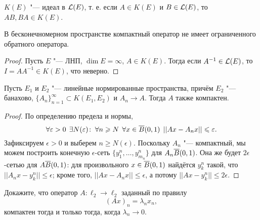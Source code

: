\documentclass[main]{subfiles}
\begin{document}
\begin{exercise}
  \( K(E) \) "--- идеал в \( \Linears{E} \),
  т. е. если \( A \in K(E) \) и \( B \in \Linears{E} \),
  то \( AB, BA \in K(E) \).
\end{exercise}

\begin{corollary}
  В бесконечномерном пространстве компактный оператор
  не имеет ограниченного обратного оператора.
\end{corollary}
\begin{proof}
  Пусть \( E \) "--- ЛНП, \( \dim E = \infty \), \( A \in K(E) \).
  Тогда если \( A^{-1} \in \Linears{E} \), то
  \( I = A A^{-1} \in K(E) \), что неверно.
\end{proof}

\begin{theorem}
  Пусть \( E_1 \) и \( E_2 \) "---
  линейные нормированные пространства,
  причём \( E_2 \) "--- банахово,
  \( \{ A_n \}_{n=1}^\infty \subset K(E_1, E_2) \)
  и \( A_n \to A \).
  Тогда \( A \) также компактен.
\end{theorem}
\begin{proof}
  По определению предела и нормы,
  \[
    \forall {\varepsilon> 0} \; \, \exists N(\varepsilon) \colon \:
    \forall {n \geqslant N} \; \,
    \forall {x \in \overline{B}(0, 1)} \; \,
    ||A x - A_n x|| \leqslant \varepsilon.
  \]
  Зафиксируем \( \epsilon > 0 \)
  и выберем \( n \ge N(\epsilon) \).
  Поскольку \( A_n \) "--- компактный,
  мы можем построить конечную \( \epsilon \)-сеть
  \( \{ y^n_1, \dots, y^n_{m_n} \} \)
  для \( A_n \overline{B}(0, 1) \).
  Она же будет \( 2\epsilon \)-сетью для
  \( A \overline{B}(0, 1) \):
  для произвольного \( x \in \overline{B}(0, 1) \)
  найдётся \( y^n_k \) такой,
  что \( ||A_n x - y^n_k|| \le \epsilon \);
  кроме того, \( ||A x - A_n x|| \le \epsilon \),
  а потому \( ||A x - y^n_k|| \le 2\epsilon \).
\end{proof}

\begin{exercise}
  Докажите, что оператор
  \( A : \ell_2 \to \ell_2 \) заданный
  по правилу
  \[
    (A x)_n = \lambda_n x_n,
  \]
  компактен тогда и только тогда,
  когда \( \lambda_n \to 0 \).
\end{exercise}
\end{document}
